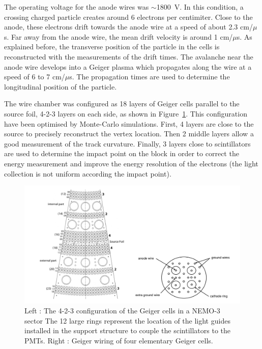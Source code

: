 \documentclass[main.tex]{subfiles}
\begin{document}
\NI The operating voltage for the anode wires was $\sim$1800~V. In this condition, a crossing charged particle creates around 6 electrons per centimiter. Close to the anode, these electrons drift towards the anode wire at a speed of about 2.3 cm/$\mu$s. Far away from the anode wire, the mean drift velocity is around 1 cm/$\mu$s. As explained before, the transverse position of the particle in the cells is reconstructed with the measurements of the drift times. The avalanche near the anode wire develops into a Geiger plasma which propagates along the wire at a speed of 6 to 7 cm/$\mu$s. The propagation times are used to determine the longitudinal position of the particle.


\bigskip


\NI The wire chamber was configured as 18 layers of Geiger cells parallel to the source foil, 4-2-3 layers on each side, as shown in Figure~\ref{TrackerNEMOView}. This configuration have been optimised by Monte-Carlo simulations. First, 4 layers are close to the source to precisely reconstruct the vertex location. Then 2 middle layers allow a good measurement of the track curvature. Finally, 3 layers close to scintillators are used to determine the impact point on the block in order to correct the energy measurement and improve the energy resolution of the electrons (the light collection is not uniform according the impact point).   



\begin{figure}[h!]
\begin{center}
\includegraphics[scale=0.30]{pictures/Chap3/TrackerNEMOView.png}
\caption{Left : The 4-2-3 configuration of the Geiger cells in a NEMO-3 sector The 12 large rings represent the location of the light guides installed in the support structure to couple the scintillators to the PMTs. Right : Geiger
wiring of four elementary Geiger cells.}
\label{TrackerNEMOView}
\end{center}
\end{figure}
\end{document}
